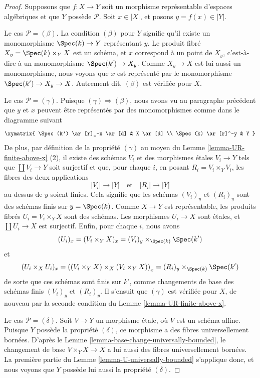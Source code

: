 \begin{proof}
Supposons que $f : X \to Y$ soit un morphisme représentable d'espaces
algébriques et que $Y$ possède $\mathcal{P}$. Soit $x \in |X|$, et posons
$y = f(x) \in |Y|$.

\medskip\noindent
Le cas $\mathcal{P} = (\beta)$. La condition $(\beta)$ pour $Y$ signifie
qu'il existe un monomorphisme $\Spec(k) \to Y$ représentant $y$.
Le produit fibré $X_y = \Spec(k) \times_Y X$ est un schéma, et
$x$ correspond à un point de $X_y$, c'est-à-dire à un monomorphisme
$\Spec(k') \to X_y$. Comme $X_y \to X$ est lui aussi un monomorphisme,
nous voyons que $x$ est représenté par le monomorphisme
$\Spec(k') \to X_y \to X$.
Autrement dit, $(\beta)$ est vérifiée pour $X$.

\medskip\noindent
Le cas $\mathcal{P} = (\gamma)$. Puisque $(\gamma) \Rightarrow (\beta)$,
nous avons vu au paragraphe précédent que $y$ et $x$ peuvent être
représentés par des monomorphismes comme dans le diagramme suivant
$$
\xymatrix{
\Spec(k') \ar[r]_-x \ar[d] & X \ar[d] \\
\Spec(k) \ar[r]^-y & Y
}
$$
De plus, par définition de la propriété $(\gamma)$ au moyen du
Lemme \ref{lemma-UR-finite-above-x} (2),
il existe des schémas $V_i$ et des morphismes étales $V_i \to Y$ tels que
$\coprod V_i \to Y$ soit surjectif et que, pour chaque $i$, en posant
$R_i = V_i \times_Y V_i$, les fibres des deux applications
$$
|V_i| \longrightarrow |Y|
\quad\text{et}\quad
|R_i| \longrightarrow |Y|
$$
au-dessus de $y$ soient finies. Cela signifie que les schémas
$(V_i)_y$ et $(R_i)_y$ sont des schémas finis sur $y = \Spec(k)$.
Comme $X \to Y$ est représentable, les produits fibrés
$U_i = V_i \times_Y X$ sont des schémas. Les morphismes $U_i \to X$
sont étales, et $\coprod U_i \to X$ est surjectif. Enfin, pour chaque $i$,
nous avons
$$
(U_i)_x =
(V_i \times_Y X)_x =
(V_i)_y \times_{\Spec(k)} \Spec(k')
$$
et
$$
(U_i \times_X U_i)_x =
\left((V_i \times_Y X) \times_X (V_i \times_Y X)\right)_x =
(R_i)_y \times_{\Spec(k)} \Spec(k')
$$
de sorte que ces schémas sont finis sur $k'$, comme changements de base des
schémas finis $(V_i)_y$ et $(R_i)_y$. Il s'ensuit que $(\gamma)$ est
vérifiée pour $X$, de nouveau par la seconde condition du
Lemme \ref{lemma-UR-finite-above-x}.

\medskip\noindent
Le cas $\mathcal{P} = (\delta)$. Soit $V \to Y$ un morphisme étale, où
$V$ est un schéma affine. Puisque $Y$ possède la propriété $(\delta)$,
ce morphisme a des fibres universellement bornées. D'après le
Lemme \ref{lemma-base-change-universally-bounded},
le changement de base $V \times_Y X \to X$ a lui aussi des fibres
universellement bornées. La première partie du
Lemme \ref{lemma-U-universally-bounded}
s'applique donc, et nous voyons que $Y$ possède lui aussi la propriété
$(\delta)$.


\end{proof}
